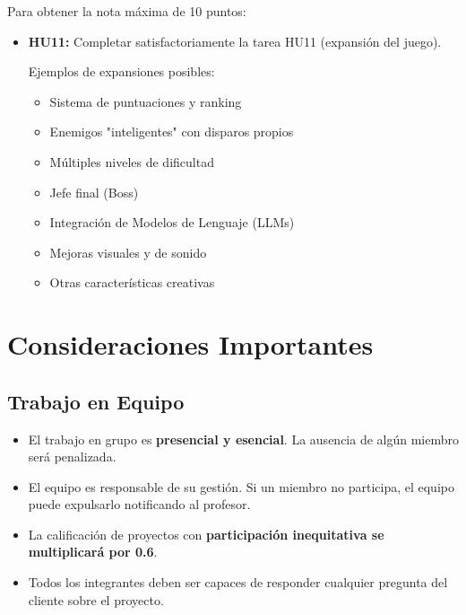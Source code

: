 \documentclass[12pt, a4paper]{article}
\begin{document}
Para obtener la nota máxima de 10 puntos:

\begin{itemize}[leftmargin=2em]
    \item \textbf{HU11:} Completar satisfactoriamente la tarea HU11 (expansión del juego).
    
    Ejemplos de expansiones posibles:
    \begin{itemize}[leftmargin=2em]
        \item Sistema de puntuaciones y ranking
        \item Enemigos "inteligentes" con disparos propios
        \item Múltiples niveles de dificultad
        \item Jefe final (Boss)
        \item Integración de Modelos de Lenguaje (LLMs)
        \item Mejoras visuales y de sonido
        \item Otras características creativas
    \end{itemize}
\end{itemize}

\section{Consideraciones Importantes}

\subsection{Trabajo en Equipo}

\begin{itemize}[leftmargin=2em]
    \item El trabajo en grupo es \textbf{presencial y esencial}. La ausencia de algún miembro será penalizada.
    
    \item El equipo es responsable de su gestión. Si un miembro no participa, el equipo puede expulsarlo notificando al profesor.
    
    \item La calificación de proyectos con \textbf{participación inequitativa se multiplicará por 0.6}.
    
    \item Todos los integrantes deben ser capaces de responder cualquier pregunta del cliente sobre el proyecto.
\end{itemize}
\end{document}
